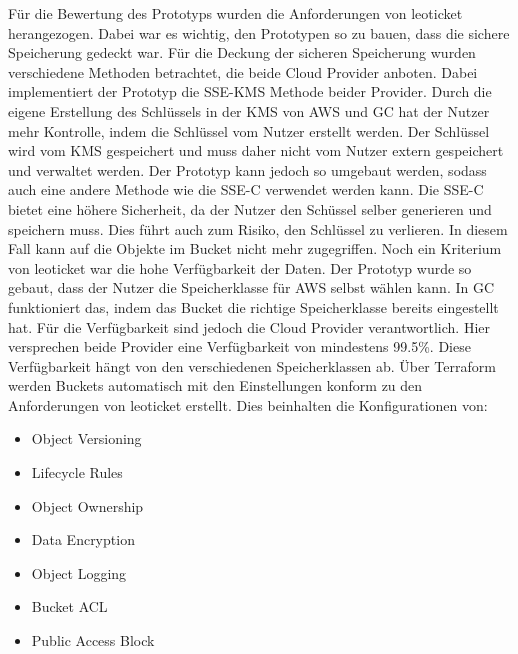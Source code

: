 Für die Bewertung des Prototyps wurden die Anforderungen von leoticket herangezogen. Dabei war es wichtig, den Prototypen so zu bauen, dass die sichere Speicherung gedeckt war. Für die Deckung der sicheren Speicherung wurden verschiedene Methoden betrachtet, die beide Cloud Provider anboten. Dabei implementiert der Prototyp die SSE-KMS Methode beider Provider. Durch die eigene Erstellung des Schlüssels in der KMS von AWS und GC hat der Nutzer mehr Kontrolle, indem die Schlüssel vom Nutzer erstellt werden. Der Schlüssel wird vom KMS gespeichert und muss daher nicht vom Nutzer extern gespeichert und verwaltet werden. Der Prototyp kann jedoch so umgebaut werden, sodass auch eine andere Methode wie die SSE-C verwendet werden kann. Die SSE-C bietet eine höhere Sicherheit, da der Nutzer den Schüssel selber generieren und speichern muss. Dies führt auch zum Risiko, den Schlüssel zu verlieren. In diesem Fall kann auf die Objekte im Bucket nicht mehr zugegriffen. Noch ein Kriterium von leoticket war die hohe Verfügbarkeit der Daten. Der Prototyp wurde so gebaut, dass der Nutzer die Speicherklasse für AWS selbst wählen kann. In GC funktioniert das, indem das Bucket die richtige Speicherklasse bereits eingestellt hat. Für die Verfügbarkeit sind jedoch die Cloud Provider verantwortlich. Hier versprechen beide Provider eine Verfügbarkeit von mindestens 99.5\%. Diese Verfügbarkeit hängt von den verschiedenen Speicherklassen ab. Über Terraform werden Buckets automatisch mit den Einstellungen konform zu den Anforderungen von leoticket erstellt. Dies beinhalten die Konfigurationen von:

\begin{itemize}
	\item Object Versioning
	\item Lifecycle Rules
	\item Object Ownership
	\item Data Encryption
	\item Object Logging
	\item Bucket ACL
	\item Public Access Block
\end{itemize}

